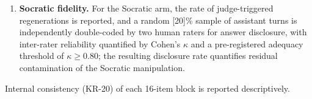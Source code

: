 \begin{enumerate}
answer-submission events are stamped by one shared wall clock (isoNow) in the interaction logger, so Delta = answer timestamp - final tool-interaction timestamp; the model-generation latency (a monotonic performance.now duration) is NOT used. Timestamps carried by pcp_consolidate.js: response_ts, query_ts, click ts, answer_ts.
    \item \textbf{Socratic fidelity.} For the Socratic arm, the rate of judge-triggered regenerations is reported, and a random [20]\% sample of assistant turns is independently double-coded by two human raters for answer disclosure, with inter-rater reliability quantified by Cohen's $\kappa$ \parencite{cohen1960} %
    and a pre-registered adequacy threshold of $\kappa \geq 0.80$; the resulting disclosure rate quantifies residual contamination of the Socratic manipulation.
\end{enumerate}
Internal consistency (KR-20) of each 16-item block is reported descriptively.

